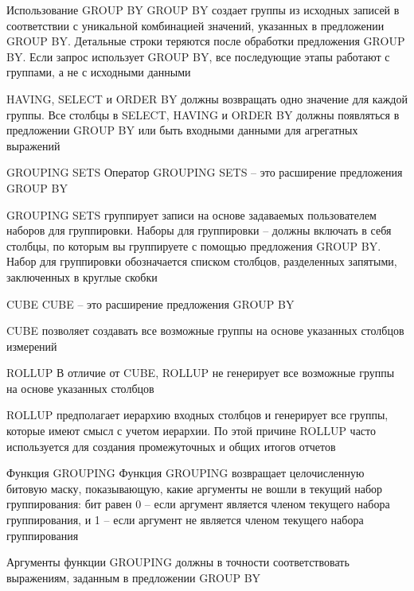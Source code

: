 \documentclass[12pt]{article}
\begin{document}
\begin{nota}{Использование GROUP BY}
    GROUP BY создает группы из исходных записей в соответствии с уникальной комбинацией значений, указанных в предложении GROUP BY. Детальные строки теряются после обработки предложения GROUP BY. Если запрос использует GROUP BY, все последующие этапы работают с группами, а не с исходными данными

    HAVING, SELECT и ORDER BY должны возвращать одно значение для каждой группы. Все столбцы в SELECT, HAVING и ORDER BY должны появляться в предложении GROUP BY или быть входными данными для агрегатных выражений 
\end{nota}

\begin{defin}{GROUPING SETS}
    Оператор GROUPING SETS -- это расширение предложения GROUP BY 

    GROUPING SETS группирует записи на основе задаваемых пользователем наборов для группировки. Наборы для группировки -- должны включать в себя столбцы, по которым вы группируете с помощью предложения GROUP BY. Набор для группировки обозначается списком столбцов, разделенных запятыми, заключенных в круглые скобки
\end{defin}

\begin{defin}{CUBE}
    CUBE -- это расширение предложения GROUP BY 
    
    CUBE позволяет создавать все возможные группы на основе указанных столбцов измерений 
\end{defin}

\begin{defin}{ROLLUP}
    В отличие от CUBE, ROLLUP не генерирует все возможные группы на основе указанных столбцов 

    ROLLUP предполагает иерархию входных столбцов и генерирует все группы, которые имеют смысл с учетом иерархии. По этой причине ROLLUP часто используется для создания промежуточных и общих итогов отчетов 
\end{defin}

\begin{defin}{Функция GROUPING}
    Функция GROUPING возвращает целочисленную битовую маску, показывающую, какие аргументы не вошли в текущий набор группирования: бит равен 0 -- если аргумент является членом текущего набора группирования, и 1 -- если аргумент не является членом текущего набора группирования

    Аргументы функции GROUPING должны в точности соответствовать выражениям, заданным в предложении GROUP BY 
\end{defin}
\end{document}
